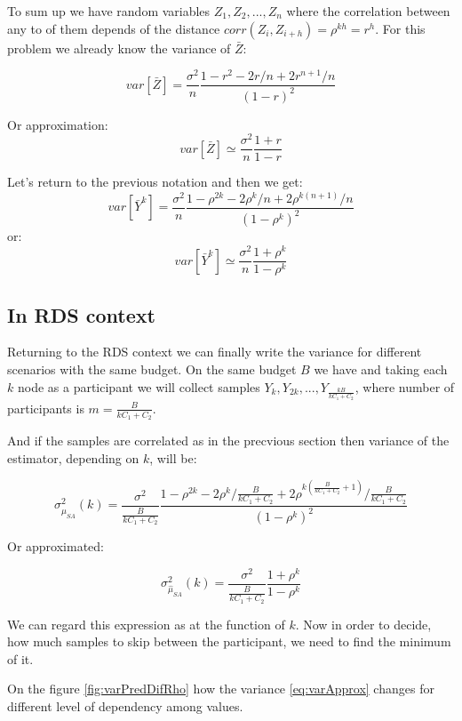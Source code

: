 \documentclass[12pt]{report}
\begin{document}
To sum up we have random variables $Z_1, Z_2, ..., Z_n$ where the correlation between any to of them depends of the distance $corr(Z_i, Z_{i+h}) = \rho^{kh} = r^h$. For this problem we already know the variance of $\bar{Z}$:


$$ var\left[\bar{Z} \right] = \frac{\sigma^2}{n}\frac{1-r^2 - 2r/n + 2r^{n+1}/n}{(1-r)^2}$$

Or approximation:
$$var\left[\bar{Z} \right] \simeq  \frac{\sigma^2}{n} \frac{1+r}{1-r}$$



Let's return to the previous notation and then we get:
$$var\left[\bar{Y}^k \right] = \frac{\sigma^2}{n}\frac{1-\rho^{2k} - 2\rho^k/n + 2\rho^{k(n+1)}/n}{(1-\rho^k)^2}$$
or:
$$var\left[\bar{Y}^k \right] \simeq  \frac{\sigma^2}{n} \frac{1+\rho^k}{1-\rho^k}$$


\subsection{In RDS context}

Returning to the RDS context we can finally write the variance for different scenarios with the same budget. On the same budget $B$ we have and taking each $k$ node as a participant we will collect samples $Y_k, Y_{2k}, ..., Y_{\frac{kB}{kC_1 + C_2}}$, where number of participants is $m = \frac{B}{kC_1 + C_2}$. 
 
And if the samples are correlated as in the precvious section then variance of the estimator, depending on $k$, will be:

$$ \sigma^2_{\hat{\mu}_{SA}} (k) = \frac{\sigma^2}{\frac{B}{kC_1 + C_2}}\frac{1-\rho^{2k} - 2\rho^k/\frac{B}{kC_1 + C_2} + 2\rho^{k(\frac{B}{kC_1 + C_2}+1)}/\frac{B}{kC_1 + C_2}}{(1-\rho^k)^2}$$

Or approximated:

\begin{equation}
\label{eq:varApprox}
 \sigma^2_{\hat{\mu}_{SA}} (k) = \frac{\sigma^2}{\frac{B}{kC_1 + C_2}} \frac{1+\rho^k}{1-\rho^k}
\end{equation}

We can regard this expression as at the function of $k$. Now in order to decide, how much samples to skip between the participant, we need to find the minimum of it.


On the figure \ref{fig:varPredDifRho} how the variance \ref{eq:varApprox} changes for different level of dependency among values.
\end{document}
